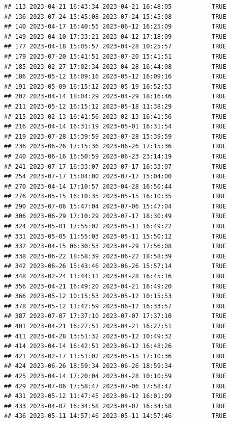 \documentclass[
]{article}
\begin{document}
\begin{verbatim}
## 113 2023-04-21 16:43:34 2023-04-21 16:48:05           TRUE
## 136 2023-07-24 15:45:08 2023-07-24 15:45:08           TRUE
## 140 2023-04-17 16:40:55 2023-06-12 16:25:09           TRUE
## 149 2023-04-10 17:33:21 2023-04-12 17:18:09           TRUE
## 177 2023-04-18 15:05:57 2023-04-28 10:25:57           TRUE
## 179 2023-07-20 15:41:51 2023-07-20 15:41:51           TRUE
## 185 2023-02-27 17:02:34 2023-04-28 16:44:08           TRUE
## 186 2023-05-12 16:09:16 2023-05-12 16:09:16           TRUE
## 191 2023-05-09 16:15:12 2023-05-19 16:52:53           TRUE
## 202 2023-04-14 18:04:29 2023-04-29 18:16:46           TRUE
## 211 2023-05-12 16:15:12 2023-05-18 11:38:29           TRUE
## 215 2023-02-13 16:41:56 2023-02-13 16:41:56           TRUE
## 216 2023-04-14 16:31:19 2023-05-01 16:31:54           TRUE
## 219 2023-07-28 15:39:59 2023-07-28 15:39:59           TRUE
## 236 2023-06-26 17:15:36 2023-06-26 17:15:36           TRUE
## 240 2023-06-16 16:50:59 2023-06-23 23:14:19           TRUE
## 241 2023-07-17 16:33:07 2023-07-17 16:33:07           TRUE
## 254 2023-07-17 15:04:00 2023-07-17 15:04:00           TRUE
## 270 2023-04-14 17:10:57 2023-04-28 16:50:44           TRUE
## 276 2023-05-15 16:10:35 2023-05-15 16:10:35           TRUE
## 290 2023-07-06 15:47:04 2023-07-06 15:47:04           TRUE
## 306 2023-06-29 17:10:29 2023-07-17 18:30:49           TRUE
## 324 2023-05-01 17:55:02 2023-05-11 16:49:22           TRUE
## 331 2023-05-05 11:55:03 2023-05-11 15:50:12           TRUE
## 332 2023-04-15 06:30:53 2023-04-29 17:56:08           TRUE
## 338 2023-06-22 18:58:39 2023-06-22 18:58:39           TRUE
## 342 2023-06-26 15:43:46 2023-06-26 15:57:14           TRUE
## 348 2023-02-24 11:44:11 2023-04-28 16:45:16           TRUE
## 356 2023-04-21 16:49:20 2023-04-21 16:49:20           TRUE
## 366 2023-05-12 10:15:53 2023-05-12 10:15:53           TRUE
## 378 2023-05-12 11:42:59 2023-06-12 16:33:57           TRUE
## 387 2023-07-07 17:37:10 2023-07-07 17:37:10           TRUE
## 401 2023-04-21 16:27:51 2023-04-21 16:27:51           TRUE
## 411 2023-04-28 13:51:32 2023-05-12 10:49:32           TRUE
## 414 2023-04-14 16:42:51 2023-06-12 16:48:26           TRUE
## 421 2023-02-17 11:51:02 2023-05-15 17:10:36           TRUE
## 424 2023-06-26 18:59:34 2023-06-26 18:59:34           TRUE
## 425 2023-04-14 17:20:04 2023-04-28 10:10:59           TRUE
## 429 2023-07-06 17:58:47 2023-07-06 17:58:47           TRUE
## 431 2023-05-12 11:47:45 2023-06-12 16:01:09           TRUE
## 433 2023-04-07 16:34:58 2023-04-07 16:34:58           TRUE
## 436 2023-05-11 14:57:46 2023-05-11 14:57:46           TRUE

\end{verbatim}
\end{document}
